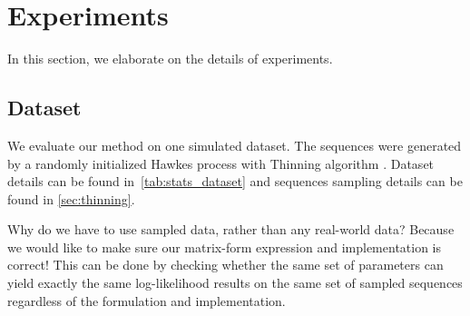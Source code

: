\documentclass{article}
\begin{document}
\section{Experiments}
\label{sec:experiments}

In this section, we elaborate on the details of experiments.

\subsection{Dataset}
\label{sec:data_stats}
We evaluate our method on one simulated dataset.
The sequences were generated by a randomly initialized Hawkes process with {Thinning algorithm} \citep{liniger-09-hawkes}.
Dataset details can be found in~\cref{tab:stats_dataset} and sequences sampling details can be found in \cref{sec:thinning}. 

Why do we have to use sampled data, rather than any real-world data? Because we would like to make sure our matrix-form expression and implementation is correct! This can be done by checking whether the same set of parameters can yield exactly the same log-likelihood results on the same set of sampled sequences regardless of the formulation and implementation. 
\end{document}
